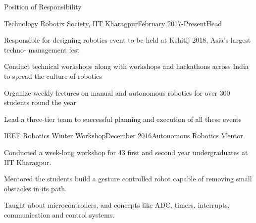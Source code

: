 \documentclass{resume} %
\begin{document}
\begin{rSection}{Position of Responsibility}

\begin{rSubsection}{Technology Robotix Society, IIT Kharagpur}{February 2017-Present}{Head}{}
\item Responsible for designing robotics event to be held at Kshitij 2018, Asia’s largest techno-
management fest 
\item Conduct technical workshops along with
workshops and hackathons across India to spread the culture of robotics 
\item Organize weekly lectures on manual and autonomous robotics for over 300 students round the year 
\item Lead a three-tier team to successful planning and execution of all these events

\end{rSubsection}



\begin{rSubsection}{IEEE Robotics Winter Workshop}{December 2016}{Autonomous Robotics Mentor}{}
\item Conducted a week-long workshop for 43 first and second year undergraduates at IIT Kharagpur. 
\item Mentored the students build a gesture controlled robot capable of removing small obstacles in its path.
\item Taught about microcontrollers, and concepts like ADC, timers, interrupts, communication and control systems.

\end{rSubsection}










\end{rSection}





\end{document}
